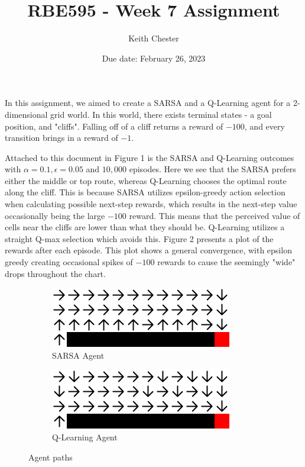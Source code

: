 \documentclass{article}
\title{RBE595 - Week 7 Assignment}
\author{Keith Chester}
\date{Due date: February 26, 2023}
\begin{document}
\maketitle

In this assignment, we aimed to create a SARSA and a Q-Learning agent for a 2-dimensional grid world. In this world, there exists terminal states - a goal position, and "cliffs". Falling off of a cliff returns a reward of $-100$, and every transition brings in a reward of $-1$.

Attached to this document in Figure 1 is the SARSA and Q-Learning outcomes with $\alpha=0.1,\epsilon=0.05$ and $10,000$ episodes. Here we see that the SARSA prefers either the middle or top route, whereas Q-Learning chooses the optimal route along the cliff. This is because SARSA utilizes epsilon-greedy action selection when calculating possible next-step rewards, which results in the next-step value occasionally being the large $-100$ reward. This means that the perceived value of cells near the cliffs are lower than what they should be. Q-Learning utilizes a straight Q-max selection which avoids this. Figure 2 presents a plot of the rewards after each episode. This plot shows a general convergence, with epsilon greedy creating occasional spikes of $-100$ rewards to cause the seemingly "wide" drops throughout the chart.

\begin{figure}
    \begin{subfigure}{.5\textwidth}
        \centering
        \includegraphics[width=.8\linewidth]{imgs/sarsa.png}
        \caption{SARSA Agent}
    \end{subfigure}
    \begin{subfigure}{.5\textwidth}
        \centering
        \includegraphics[width=.8\linewidth]{imgs/qlearning.png}
        \caption{Q-Learning Agent}
    \end{subfigure}
    \caption{Agent paths}
\end{figure}
\end{document}
